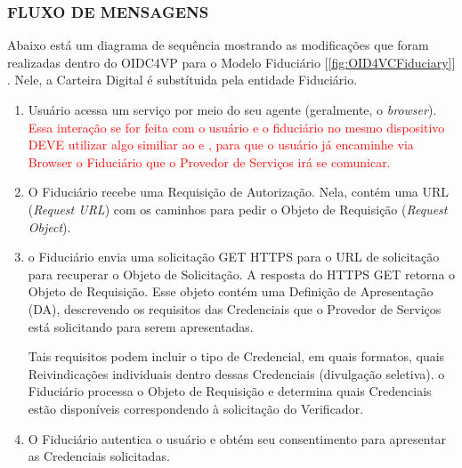 \subsubsection{FLUXO DE MENSAGENS}

Abaixo está um diagrama de sequência mostrando as modificações que foram realizadas dentro do OIDC4VP para o Modelo Fiduciário [\ref{fig:OID4VCFiduciary}] . Nele, a Carteira Digital é substítuida pela entidade Fiduciário. 



\begin{enumerate}

    \item Usuário acessa um serviço por meio do seu agente (geralmente, o \textit{browser}). \textcolor{red}{Essa interação se for feita com o usuário e o fiduciário no mesmo dispositivo DEVE utilizar algo similiar ao \cite{FedCM} e \cite{openYolo}, para que o usuário já encaminhe via Browser o Fiduciário que o Provedor de Serviços irá se comunicar.}   
    \begin{comment}
            \textbf{REVISAR A PARTE 7. WALLET INVOCATION PARA VER SE REALMENTE PRECISA UTILIZAR OUTROS PROTOCOLOS, PORQUE O QUE SE QUER AQUI É CRIAR UM MEIO PARA CHAMAR O FIDUCIÁRIO/CARTEIRA SEM UM REGISTRO PRÉVIO}.
    \end{comment}
    
    \item O Fiduciário recebe uma Requisição de Autorização. Nela, contém uma URL (\textit{Request URL}) com os caminhos para pedir o Objeto de Requisição (\textit{Request Object}). 

    \item o Fiduciário envia uma solicitação GET HTTPS para o URL de solicitação para recuperar o Objeto de Solicitação. A resposta do HTTPS GET retorna o Objeto de Requisição. Esse objeto contém uma Definição de Apresentação (DA), descrevendo os requisitos das Credenciais que o Provedor de Serviços está solicitando para serem apresentadas. 
    
    Tais requisitos podem incluir o tipo de Credencial, em quais formatos, quais Reivindicações individuais dentro dessas Credenciais (divulgação seletiva). o Fiduciário processa o Objeto de Requisição e determina quais Credenciais estão disponíveis correspondendo à solicitação do Verificador. 
    
    \item O Fiduciário autentica o usuário e obtém seu consentimento para apresentar as Credenciais solicitadas.
    

\end{enumerate}

